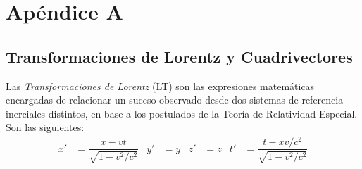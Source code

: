\appendix
\chapter*{Apéndice A}\label{cap:A}
\setcounter{section}{0}
\renewcommand{\thesection}{A.\arabic{section}}
\setcounter{table}{0}
\renewcommand{\thetable}{A.\arabic{table}}
\setcounter{equation}{0}
\renewcommand{\theequation}{A.\arabic{equation}}

\section{Transformaciones de Lorentz y Cuadrivectores}\label{sec:Lorentz}
Las \textit{Transformaciones de Lorentz} (LT) son las expresiones matemáticas encargadas de relacionar un suceso observado desde dos sistemas de referencia inerciales distintos, en base a los postulados de la Teoría de Relatividad Especial. Son las siguientes:
\setlength{\abovedisplayskip}{6pt}
\setlength{\belowdisplayskip}{6pt}
\begin{align}
x' &= \dfrac{x-vt}{\sqrt{1-v^2/c^2}} & y' &=y & z' &=z & t' &=\dfrac{t-xv/c^2}{\sqrt{1-v^2/c^2}}\label{eq:TLorentz1}
\end{align}

